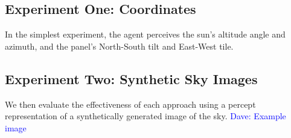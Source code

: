 \documentclass[11pt]{article}
\newcommand{\dnote}[1]{\textcolor{blue}{Dave: #1}}
\begin{document}
\begin{figure}
\begin{center}
 \hspace{10mm}
\end{center}
\end{figure}

\subsection{Experiment One: Coordinates}

In the simplest experiment, the agent perceives the sun's altitude angle and azimuth, and the panel's North-South tilt and East-West tile.

\subsection{Experiment Two: Synthetic Sky Images}

We then evaluate the effectiveness of each approach using a percept representation of a synthetically generated image of the sky.
\dnote{Example image}
\end{document}
